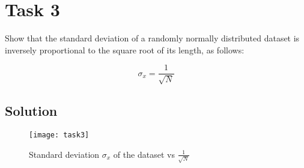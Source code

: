 \newpage
\section{Task 3}
Show that the standard deviation of a randomly normally distributed dataset is inversely proportional to the square root of its length, as follows:

\begin{equation}
\sigma_x = \frac{1}{\sqrt{N}}
\end{equation}

\subsection*{Solution}

\begin{listing}[H]
    
\end{listing}

\begin{figure}[H]
    \centering
    \texttt{[image: task3]}
    \caption{Standard deviation $\sigma_x$ of the dataset vs $\frac{1}{\sqrt{N}}$}
\end{figure}